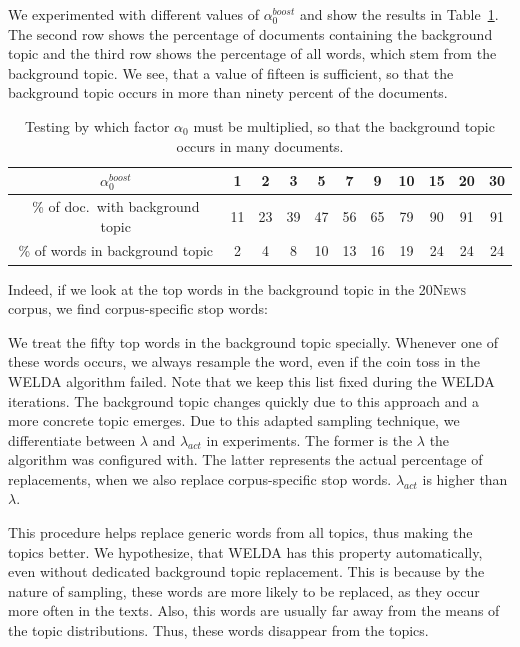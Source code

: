 \documentclass[
        a4paper,
        titlepage,
        twoside,
        parskip,
        numbers=noenddot
        ]{scrbook}
\newcommand{\ra}[1]{\renewcommand{\arraystretch}{#1}}
\theoremstyle{break}
\begin{document}
We experimented with different values of $\alpha_0^{boost}$ and show the results in Table~\ref{table:alpha0_boost}.
The second row shows the percentage of documents containing the background topic and the third row shows the percentage of all words, which stem from the background topic.
We see, that a value of fifteen is sufficient, so that the background topic occurs in more than ninety percent of the documents.
\begin{table}[]
  \ra{1.2}
  \centering
  \caption{Testing by which factor $\alpha_0$ must be multiplied, so that the background topic occurs in many documents.}
  \label{table:alpha0_boost}
  \begin{tabular}{ccccccccccc}
    \toprule
    $\alpha_0^{boost}$                & 1     & 2     & 3     & 5     & 7     & 9     & 10    & 15    & 20    & 30    \\
    \midrule
  \% of doc.\ with background topic  & 11  & 23  & 39  & 47  & 56  & 65  & 79  & 90  & 91  & 91  \\
  \% of words in background topic & 2   & 4   & 8   & 10  & 13  & 16  & 19  & 24  & 24  & 24 \\
    \bottomrule
  \end{tabular}
\end{table}
Indeed, if we look at the top words in the background topic in the \textsc{20News} corpus, we find corpus-specific stop words: \\
\noindent{}

We treat the fifty top words in the background topic specially.
Whenever one of these words occurs, we always resample the word, even if the coin toss in the WELDA algorithm failed.
Note that we keep this list fixed during the WELDA iterations.
The background topic changes quickly due to this approach and a more concrete topic emerges.
Due to this adapted sampling technique, we differentiate between $\lambda$ and $\lambda_{act}$ in experiments.
The former is the $\lambda$ the algorithm was configured with.
The latter represents the actual percentage of replacements, when we also replace corpus-specific stop words.
$\lambda_{act}$ is higher than $\lambda$.

This procedure helps replace generic words from all topics, thus making the topics better.
We hypothesize, that WELDA has this property automatically, even without dedicated background topic replacement.
This is because by the nature of sampling, these words are more likely to be replaced, as they occur more often in the texts.
Also, this words are usually far away from the means of the topic distributions.
Thus, these words disappear from the topics.
\end{document}
